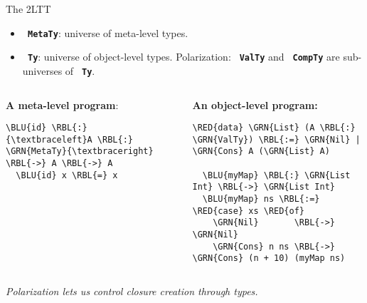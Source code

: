 \documentclass[dvipsnames,aspectratio=169]{beamer}
\newcommand{\ttt}[1]{{\texttt{#1}}}
\theoremstyle{remark}
\newcommand{\RED}[1]{{\color{BrickRed} #1}}
\newcommand{\GRN}[1]{{\color{OliveGreen} #1}}
\newcommand{\RBL}[1]{{\color{RoyalBlue} #1}}
\newcommand{\BLU}[1]{{\color{Blue} #1}}
\begin{document}
\begin{frame}[fragile]{The 2LTT}

\begin{itemize}
  \item \textbf{\ttt{\GRN{MetaTy}}}: universe of meta-level types.
  \item \textbf{\ttt{\GRN{Ty}}}: universe of object-level types. \alert{Polarization}:
    \textbf{\ttt{\GRN{ValTy}}} and \textbf{\ttt{\GRN{CompTy}}} are sub-universes of \textbf{\ttt{\GRN{Ty}}}.
\end{itemize}
\vspace{1em}

\begin{columns}
\begin{column}{0.4\textwidth}
\textbf{A meta-level program}:
\begin{Verbatim}[commandchars=\\\{\}]
  \BLU{id} \RBL{:} {\textbraceleft}A \RBL{:} \GRN{MetaTy}{\textbraceright} \RBL{->} A \RBL{->} A
  \BLU{id} x \RBL{=} x




\end{Verbatim}
\end{column}

\begin{column}{0.6\textwidth}
\textbf{An object-level program:}
\begin{Verbatim}[commandchars=\\\{\}]
  \RED{data} \GRN{List} (A \RBL{:} \GRN{ValTy}) \RBL{:=} \GRN{Nil} | \GRN{Cons} A (\GRN{List} A)

  \BLU{myMap} \RBL{:} \GRN{List Int} \RBL{->} \GRN{List Int}
  \BLU{myMap} ns \RBL{:=} \RED{case} xs \RED{of}
    \GRN{Nil}       \RBL{->} \GRN{Nil}
    \GRN{Cons} n ns \RBL{->} \GRN{Cons} (n + 10) (myMap ns)
\end{Verbatim}
\end{column}
\end{columns}
\vspace{2em}
\emph{Polarization lets us control closure creation through types.}
\end{frame}


\end{document}
